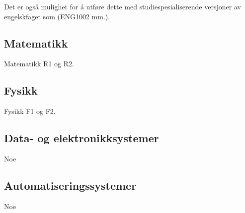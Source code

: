 		Det er også mulighet for å utføre dette med studiespesialiserende versjoner av engelskfaget som (ENG1002 mm.).

	\subsection*{Matematikk}
		Matematikk R1 og R2.

	\subsection*{Fysikk}
		Fysikk F1 og F2.

	\subsection*{Data- og elektronikksystemer}
		Noe

	\subsection*{Automatiseringssystemer}
		Noe
